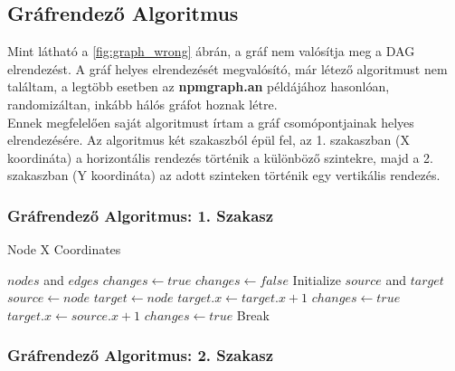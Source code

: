 \pagebreak

\subsection{Gráfrendező Algoritmus}
Mint látható a \ref{fig:graph_wrong} ábrán, a gráf nem valósítja meg a DAG elrendezést. A gráf helyes elrendezését megvalósító, már létező algoritmust nem találtam, a legtöbb esetben az \textbf{npmgraph.an} példájához hasonlóan, randomizáltan, inkább hálós gráfot hoznak létre. \\

Ennek megfelelően saját algoritmust írtam a gráf csomópontjainak helyes elrendezésére. Az algoritmus két szakaszból épül fel, az 1. szakaszban (X koordináta) a horizontális rendezés történik a különböző szintekre, majd a 2. szakaszban (Y koordináta) az adott szinteken történik egy vertikális rendezés. 

\subsubsection{Gráfrendező Algoritmus: 1. Szakasz}

\begin{algorithm}
	\caption{Node X Coordinates}
	\centering
	\begin{algorithmic}
		\Require $nodes$ and $edges$		
		\State $changes \gets true$
			\State $changes \gets false$
				\State Initialize $source$ and $target$
						\State $source \gets node$
						\State $target \gets node$
					\EndIf
							\State $target.x \gets target.x+1$
							\State $changes \gets true$
							\State $target.x \gets source.x+1$
							\State $changes \gets true$
						\EndIf
						\State Break 
					\EndIf
				\EndFor
			\EndFor
		\EndWhile 
	\end{algorithmic}
\end{algorithm}

\pagebreak

\subsubsection{Gráfrendező Algoritmus: 2. Szakasz}

